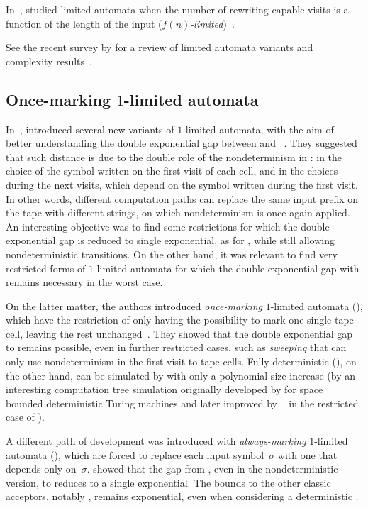 In~\citeyear{WecBra79}, \citeauthor{WecBra79} studied limited automata when the number of rewriting-capable visits is a function of the length of the input (\emph{$f(n)$-limited})~\cite{WecBra79}.

See the recent survey by \citeauthor{Pig19} for a review of limited automata variants and complexity results~\cite{Pig19}.


\subsection{Once-marking \texorpdfstring{$1$}{1}-limited automata}
In~\citeyear{PigPri23a}, \citeauthor{PigPri23a} introduced several new variants of $1$-limited automata, with the aim of better understanding the double exponential gap between \OLA and \ODFA~\cite{PigPri23a,PigPri23}.
They suggested that such distance is due to the double role of the nondeterminism in \OLAs: in the choice of the symbol written on the first visit of each cell, and in the choices during the next visits, which depend on the symbol written during the first visit.
In other words, different computation paths can replace the same input prefix on the tape with different strings, on which nondeterminism is once again applied.
An interesting objective was to find some restrictions for which the double exponential gap is reduced to single exponential, as for \ODLA, while still allowing nondeterministic transitions.
On the other hand, it was relevant to find very restricted forms of $1$-limited automata for which the double exponential gap with \ODFA remains necessary in the worst case.

On the latter matter, the authors introduced \emph{once-marking} $1$-limited automata (\OMOLA), which have the restriction of only having the possibility to mark one single tape cell, leaving the rest unchanged~\cite{PigPri23}.
They showed that the double exponential gap to \ODFA remains possible, even in further restricted cases, such as \emph{sweeping} \OMOLA that can only use nondeterminism in the first visit to tape cells.
Fully deterministic \OMOLA (\OMODLA), on the other hand, can be simulated by \TDFAs with only a polynomial size increase (by an interesting computation tree simulation originally developed by \citeauthor{Sip80a} for space bounded deterministic Turing machines and later improved by \citeauthor{GefMer+07}~\cite{Sip80a,GefMer+07} in the restricted case of \TDFAs).

A different path of development was introduced with \emph{always-marking} $1$-limited automata (\AMOLA), which are forced to replace each input symbol~$\sigma$ with one that depends only on~$\sigma$.
\citeauthor{PigPri23a} showed that the gap from \AMOLA, even in the nondeterministic version, to \ODFA reduces to a single exponential.
The bounds to the other classic acceptors, notably \TNFA, remains exponential, even when considering a deterministic \AMOLA.

